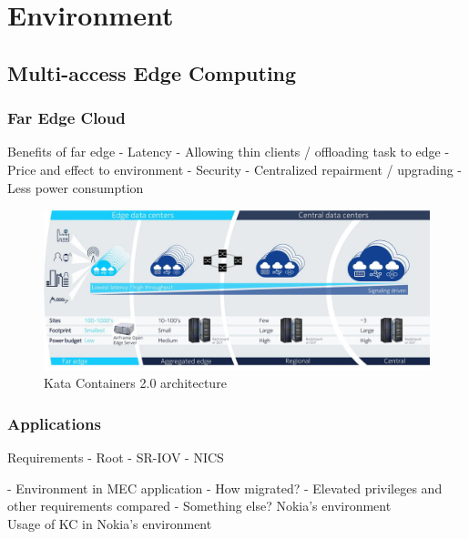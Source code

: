 \chapter{Environment}
\label{chapter:environment}

\section{Multi-access Edge Computing}

\subsection{Far Edge Cloud}

Benefits of far edge
    - Latency
    - Allowing thin clients / offloading task to edge
    - Price and effect to environment
    - Security
    - Centralized repairment / upgrading
    - Less power consumption
    

\begin{figure}[ht]
  \begin{center}
    \includegraphics[width=15cm]{LaTeX/images/AirFrameOpenEdgeServer.png}
    \caption{Kata Containers 2.0 architecture \cite{AirFrameOpenEdgeServer}}
    \label{fig:AirFrameOpenEdgeServer}
  \end{center}
\end{figure}

\subsection{Applications}

Requirements
- Root
- SR-IOV
- NICS

- Environment in MEC application
    - How migrated?
    - Elevated privileges and other requirements compared
    - Something else?
Nokia's environment \\
Usage of KC in Nokia's environment \\






